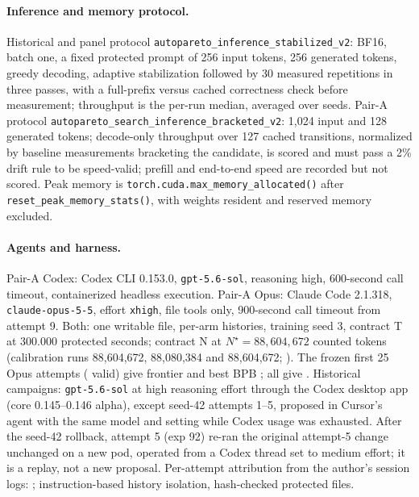 \documentclass{article}
\begin{document}
\begin{table}[H]
\caption{Recorded software environment by era. Panel, Pair-A, E1 and Opus-test rows are read from their run records; other rows are from the provenance audit.}\label{tab:env}
\centering\scriptsize
\end{table}

\paragraph{Inference and memory protocol.} Historical and panel protocol \texttt{autopareto\_inference\_stabilized\_v2}: BF16, batch one, a fixed protected prompt of 256 input tokens, 256 generated tokens, greedy decoding, adaptive stabilization followed by 30 measured repetitions in three passes, with a full-prefix versus cached correctness check before measurement; throughput is the per-run median, averaged over seeds. Pair-A protocol \texttt{autopareto\_search\_inference\_bracketed\_v2}: 1,024 input and 128 generated tokens; decode-only throughput over 127 cached transitions, normalized by baseline measurements bracketing the candidate, is scored and must pass a 2\% drift rule to be speed-valid; prefill and end-to-end speed are recorded but not scored. Peak memory is \texttt{torch.cuda.max\_memory\_allocated()} after \texttt{reset\_peak\_memory\_stats()}, with weights resident and reserved memory excluded.

\paragraph{Agents and harness.} Pair-A Codex: Codex CLI 0.153.0, \texttt{gpt-5.6-sol}, reasoning high, 600-second call timeout, containerized headless execution. Pair-A Opus: Claude Code 2.1.318, \texttt{claude-opus-5-5}, effort \texttt{xhigh}, file tools only, 900-second call timeout from attempt 9. Both: one writable file, per-arm histories, training seed 3, contract T at 300.000 protected seconds; contract N at $N^\star=88{,}604{,}672$ counted tokens (calibration runs 88,604,672, 88,080,384 and 88,604,672; ). The frozen first 25 Opus attempts (\CROpValidFrozen{} valid) give frontier \CROpFrontierFrozen{} and best BPB \CROpBestFrozen; all \CROpAttempts{} give \CROpFrontierExtended. Historical campaigns: \texttt{gpt-5.6-sol} at high reasoning effort through the Codex desktop app (core 0.145--0.146 alpha), except seed-42 attempts 1--5, proposed in Cursor's agent with the same model and setting while Codex usage was exhausted. After the seed-42 rollback, attempt 5 (exp 92) re-ran the original attempt-5 change unchanged on a new pod, operated from a Codex thread set to medium effort; it is a replay, not a new proposal. Per-attempt attribution from the author's session logs: ; instruction-based history isolation, hash-checked protected files.
\end{document}
